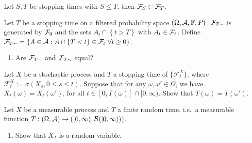  Let $S, T$ be
stopping times with $S\leq T$, then $\mathcal F_{S} \subset \mathcal F_{T}$.

\solution

Let $T$ be a stopping time on a filtered probability space $(\Omega,\mathcal A, \mathbb F,
P)$.  $\mathcal F_{T-}$ is generated by $\mathcal F_0$ and the sets $A_{t} \cap \left\{ {t>T}
\right\}$ with $A_t \in \mathcal F_t$.  Define $\mathcal F_{T\sim} = \left\{ A \in \mathcal A : A
\cap \left\{ T <t \right\} \in\mathcal F_{t} \ \forall t\geq 0 \right\}$. 
\begin{enumerate}
    \item Are $\mathcal F_{T-}$ and $\mathcal F_{T\sim}$ equal?
\end{enumerate}


Let $ X $ be a stochastic process and $ T $ a stopping time of $\{ \mathcal{F}_t^X \}$, where 
$\mathcal{F}_t^X := \sigma (X_s, 0 \leq s \leq t)$.
Suppose that for any $\omega, \omega' \in \Omega $, we have $X_t(\omega) = X_t(\omega')$,
for all $t \in [0, T(\omega)] \cap [0, \infty)$.
Show that $T(\omega) = T(\omega')$.


 Let $X$ be a measurable
process and $T$ a finite random time, i.e.\ a measurable function $T : (\Omega,
\mathcal A)\to ([0,\infty), \mathcal B([0,\infty)))$.
\begin{enumerate}
    \item Show that $X_T$ is a random variable. 
\end{enumerate}


